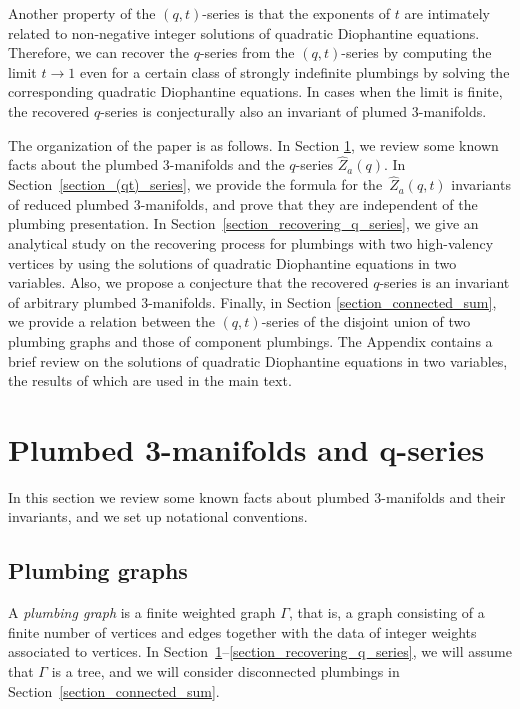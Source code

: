 \documentclass[pdftex]{sigma}
\numberwithin{equation}{section}
\begin{document}
Another property of the $ (q,t) $-series is that the exponents of $ t $ are intimately related to non-negative integer solutions of quadratic Diophantine equations. Therefore, we can recover the $ q $-series from the $ (q,t) $-series by computing the limit $ t\rightarrow 1 $ even for a certain class of strongly indefinite plumbings by solving the corresponding quadratic Diophantine equations. In cases when the limit is finite, the recovered $ q $-series is conjecturally also an invariant of plumed 3-manifolds.

The organization of the paper is as follows. In Section \ref{section_plumbed_3-manifolds}, we review some known facts about the plumbed 3-manifolds and the $q$-series $\hat{Z}_a(q)$. In Section~\ref{section_(qt)_series}, we provide the formula for the~$\hat{Z}_a(q,t)$ invariants of reduced plumbed 3-manifolds, and prove that they are independent of the plumbing presentation. In Section~\ref{section_recovering_q_series}, we give an analytical study on the recovering process for plumbings with two high-valency vertices by using the solutions of quadratic Diophantine equations in two variables. Also, we propose a conjecture that the recovered $ q $-series is an invariant of arbitrary plumbed 3-manifolds. Finally, in Section \ref{section_connected_sum}, we provide a relation between the $(q,t)$-series of the disjoint union of two plumbing graphs and those of component plumbings. The Appendix contains a brief review on the solutions of quadratic Diophantine equations in two variables, the results of which are used in the main text.

\section[Plumbed 3-manifolds and q-series]{Plumbed 3-manifolds and $\boldsymbol{q}$-series}
\label{section_plumbed_3-manifolds}

In this section we review some known facts about plumbed 3-manifolds and their invariants, and we set up notational conventions.

\subsection{Plumbing graphs}\label{subsection_plumbing_graphs}

A \textit{plumbing graph} is a finite weighted graph $ \Gamma $, that is, a graph consisting of a finite number of vertices and edges together with the data of integer weights associated to vertices. In Section~\ref{section_plumbed_3-manifolds}--\ref{section_recovering_q_series}, we will assume that $ \Gamma $ is a tree, and we will consider disconnected plumbings in Section~\ref{section_connected_sum}.
\end{document}
